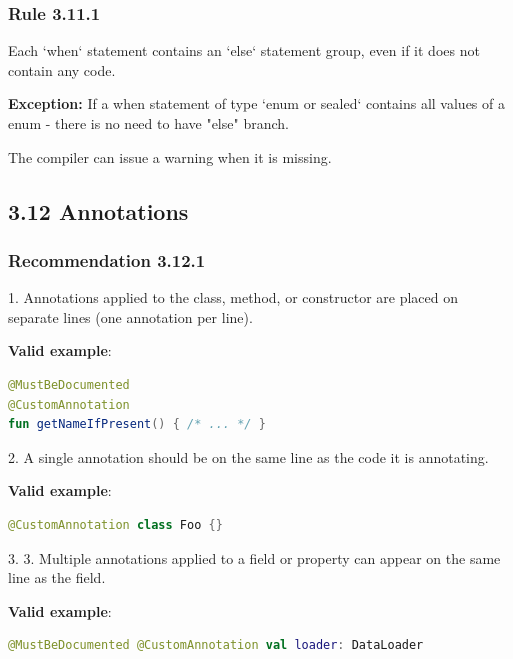 {{{{\subsubsection*{\textbf{Rule 3.11.1}}
\leavevmode\newline

Each `when` statement contains an `else` statement group, even if it does not contain any code.



\textbf{Exception:} If a when statement of type `enum or sealed` contains all values of a enum - there is no need to have "else" branch.

The compiler can issue a warning when it is missing.



\subsection*{\textbf{3.12 Annotations}}

\subsubsection*{\textbf{Recommendation 3.12.1}}
\leavevmode\newline



1. Annotations applied to the class, method, or constructor are placed on separate lines (one annotation per line). 



\textbf{Valid example}:

\begin{lstlisting}[language=Kotlin]
@MustBeDocumented
@CustomAnnotation
fun getNameIfPresent() { /* ... */ }
\end{lstlisting}


2. A single annotation should be on the same line as the code it is annotating.



\textbf{Valid example}:

\begin{lstlisting}[language=Kotlin]
@CustomAnnotation class Foo {}
\end{lstlisting}


3. 3.	Multiple annotations applied to a field or property can appear on the same line as the field.



\textbf{Valid example}:

\begin{lstlisting}[language=Kotlin]
@MustBeDocumented @CustomAnnotation val loader: DataLoader
\end{lstlisting}


}}}}
